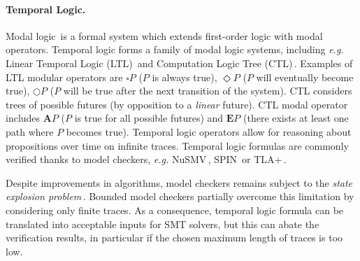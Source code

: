 
\paragraph{Temporal Logic.}
%
Modal logic\,\cite{chagrov1997modal} is a formal system which extends
first-order logic with modal operators.
%
Temporal logic forms a family of modal logic systems, including \emph{e.g.}
Linear Temporal Logic (LTL)\,\cite{sistla1985ltl} and Computation Logic Tree
(CTL)\,\cite{clarke1981ctl}.
%
Examples of LTL modular operators are \( \square P \) (\( P \) is always true),
\( \Diamond P \) (\( P \) will eventually become true), \( \bigcirc P \)
(\( P \) will be true after the next transition of the system).
%
CTL considers trees of possible futures (by opposition to a \emph{linear}
future).
%
CTL modal operator includes \( \mathbf{A} P \) (\( P \) is true for all possible
futures) and \( \mathbf{E} P \) (there exists at least one path where \( P \)
becomes true).
%
Temporal logic operators allow for reasoning about propositions over time on
infinite traces.
%
Temporal logic formulas are commonly verified thanks to model checkers,
\emph{e.g.}  NuSMV\,\cite{cimatti2002nusmv}, SPIN\,\cite{holzmann1997spin} or
TLA+\,\cite{lamport2002tla}.

Despite improvements in algorithms, model checkers remains subject to the
\emph{state explosion problem}\,\cite{clarke2012model}.
%
%
%
Bounded model checkers partially overcome this
limitation by considering only finite traces.
%
As a consequence, temporal logic formula can be translated into acceptable
inputs for SMT solvers, but this can abate the verification results, in
particular if the chosen maximum length of traces is too low. 


